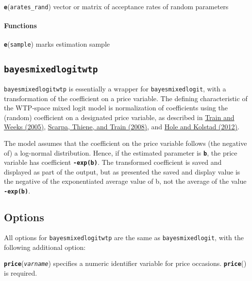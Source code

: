 \documentclass[11pt]{article}
\begin{document}
\textbf{\texttt{e}}(\texttt{arates\_rand}) vector or matrix of
acceptance rates of random parameters

\hypertarget{functions}{%
\paragraph{Functions}\label{functions}}

\textbf{\texttt{e}}(\texttt{sample}) marks estimation sample

    \hypertarget{bayesmixedlogitwtp}{%
\subsection{\texorpdfstring{\texttt{bayesmixedlogitwtp}}{bayesmixedlogitwtp}}\label{bayesmixedlogitwtp}}

\texttt{bayesmixedlogitwtp} is essentially a wrapper for
\texttt{bayesmixedlogit}, with a transformation of the coefficient on a
price variable. The defining characteristic of the WTP-space mixed logit
model is normalization of coefficients using the (random) coefficient on
a designated price variable, as described in
\href{https://link.springer.com/chapter/10.1007/1-4020-3684-1_1}{Train
and Weeks (2005)},
\href{https://econpapers.repec.org/article/oupajagec/v_3a90_3ay_3a2008_3ai_3a4_3ap_3a994-1010.htm}{Scarpa,
Thiene, and Train (2008)}, and
\href{https://link.springer.com/article/10.1007/s00181-011-0500-1}{Hole
and Kolstad (2012)}.

The model assumes that the coefficient on the price variable follows
(the negative of) a log-normal distribution. Hence, if the estimated
parameter is \textbf{\texttt{b}}, the price variable has coefficient
\textbf{\texttt{-exp(b)}}. The transformed coefficient is saved and
displayed as part of the output, but as presented the saved and display
value is the negative of the exponentiated average value of b, not the
average of the value \textbf{\texttt{-exp(b)}}.

\hypertarget{options}{%
\subsection{Options}\label{options}}

All options for \texttt{bayesmixedlogitwtp} are the same as
\texttt{bayesmixedlogit}, with the following additional option:

\textbf{\texttt{price}}(\emph{\texttt{varname}}) specifies a numeric
identifier variable for price occasions. \textbf{\texttt{price}}() is
required.
\end{document}
